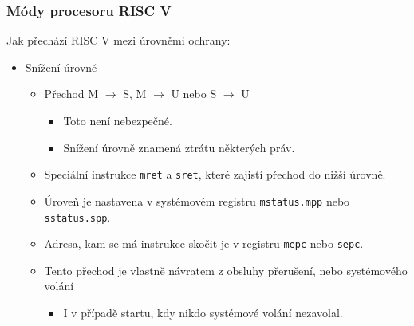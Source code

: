\documentclass[aspectratio=169]{beamer}
\begin{document}
\begin{frame}
\frametitle{Módy procesoru RISC V}

Jak přechází RISC V mezi úrovněmi ochrany:
\begin{itemize}
\item Snížení úrovně
\begin{itemize}
\item Přechod M $\rightarrow$ S, M $\rightarrow$ U nebo S $\rightarrow$ U
\begin{itemize}
\item Toto není nebezpečné.
\item Snížení úrovně znamená ztrátu některých práv.
\end{itemize}
\item Speciální instrukce \texttt{mret} a \texttt{sret}, které zajistí přechod do nižší úrovně.
\item Úroveň je nastavena v systémovém registru \texttt{mstatus.mpp} nebo \texttt{sstatus.spp}.
\item Adresa, kam se má instrukce skočit je v registru \texttt{mepc} nebo \texttt{sepc}.
\item Tento přechod je vlastně návratem z obsluhy přerušení, nebo systémového volání
\begin{itemize}
\item I v případě startu, kdy nikdo systémové volání nezavolal.
\end{itemize}
\end{itemize}
\end{itemize}

\end{frame}
\end{document}
